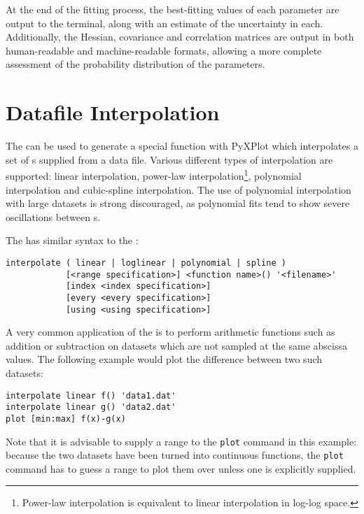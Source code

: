 At the end of the fitting process, the best-fitting values of each parameter
are output to the terminal, along with an estimate of the uncertainty in each.
Additionally, the Hessian, covariance and correlation matrices are output in
both human-readable and machine-readable formats, allowing a more complete
assessment of the probability distribution of the parameters.

\section{Datafile Interpolation}
\label{sec:spline_command}

The  can be used to generate a special function with
PyXPlot which interpolates a set of \datapoint s supplied from a data file.
Various different types of interpolation are supported: linear interpolation,
power-law interpolation\footnote{Power-law interpolation is equivalent to
linear interpolation in log-log space.}, polynomial interpolation and
cubic-spline interpolation. The use of polynomial interpolation with large
datasets is strong discouraged, as polynomial fits tend to show severe
oscillations between \datapoint s.

The  has similar syntax to the :

\begin{verbatim}
interpolate ( linear | loglinear | polynomial | spline )
            [<range specification>] <function name>() '<filename>' 
            [index <index specification>]
            [every <every specification>]
            [using <using specification>]
\end{verbatim}

A very common application of the  is to perform arithmetic
functions such as addition or subtraction on datasets which are not sampled at
the same abscissa values. The following example would plot the difference
between two such datasets:

\begin{verbatim}
interpolate linear f() 'data1.dat'
interpolate linear g() 'data2.dat'
plot [min:max] f(x)-g(x)
\end{verbatim}

\noindent Note that it is advisable to supply a range to the {\tt plot} command
in this example: because the two datasets have been turned into continuous
functions, the {\tt plot} command has to guess a range to plot them over unless
one is explicitly supplied.

